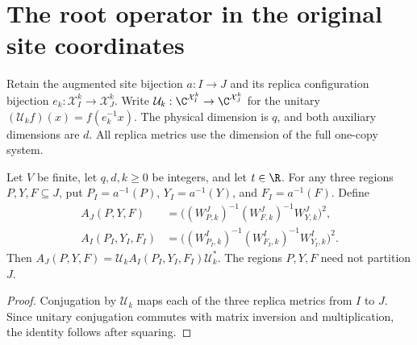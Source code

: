 \section{The root operator in the original site coordinates}

Retain the augmented site bijection $a:I\to J$ and its replica
configuration bijection $e_k:\mathcal X_I^k\to\mathcal X_J^k$.
Write $\mathcal U_k:\C^{\mathcal X_I^k}\to\C^{\mathcal X_J^k}$
for the unitary $(\mathcal U_k f)(x)=f(e_k^{-1}x)$.
The physical dimension is $q$, and both auxiliary dimensions are $d$.
All replica metrics use the dimension of the full one-copy system.

\begin{lemma}
    \label{thm:al_augmented_band_coordinates}
    \leanok
    Let $V$ be finite, let $q,d,k\ge0$ be integers, and let $t\in\R$.
    For any three regions $P,Y,F\subseteq J$, put
    $P_I=a^{-1}(P)$, $Y_I=a^{-1}(Y)$, and $F_I=a^{-1}(F)$.
    Define
    \begin{align*}
        A_J(P,Y,F)       & =\bigl((W^J_{P,k})^{-1}(W^J_{F,k})^{-1}W^J_{Y,k}\bigr)^2,       \\
        A_I(P_I,Y_I,F_I) & =\bigl((W^I_{P_I,k})^{-1}(W^I_{F_I,k})^{-1}W^I_{Y_I,k}\bigr)^2.
    \end{align*}
    Then $A_J(P,Y,F)=\mathcal U_k A_I(P_I,Y_I,F_I)\mathcal U_k^*$.
    The regions $P,Y,F$ need not partition $J$.
\end{lemma}
\begin{proof}
    \leanok
    Conjugation by $\mathcal U_k$ maps each of the three replica metrics
    from $I$ to $J$. Since unitary conjugation commutes with matrix inversion
    and multiplication, the identity follows after squaring.
\end{proof}

